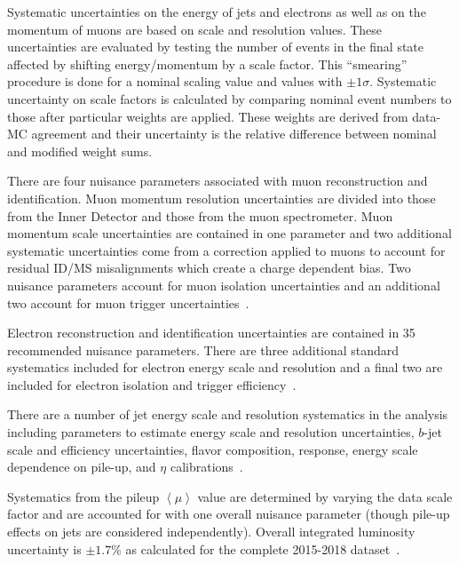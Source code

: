 Systematic uncertainties on the energy of jets and electrons as well as on the momentum of muons are based on scale and resolution values. These uncertainties are evaluated by testing the number of events in the final state affected by shifting energy/momentum by a scale factor. This ``smearing'' procedure is done for a nominal scaling value and values with $\pm 1 \sigma$. Systematic uncertainty on scale factors is calculated by comparing nominal event numbers to those after particular weights are applied. These weights are derived from data-MC agreement and their uncertainty is the relative difference between nominal and modified weight sums.  
 
There are four nuisance parameters associated with muon reconstruction and identification. Muon momentum resolution uncertainties are divided into those from the Inner Detector and those from the muon spectrometer. Muon momentum scale uncertainties are contained in one parameter and two additional systematic uncertainties come from a correction applied to muons to account for residual ID/MS misalignments which create a charge dependent bias. Two nuisance parameters account for muon isolation uncertainties and an additional two account for muon trigger uncertainties~\cite{MCPpaper}.  

Electron reconstruction and identification uncertainties are contained in 35 recommended nuisance parameters. There are three additional standard systematics included for electron energy scale and resolution and a final two are included for electron isolation and trigger efficiency~\cite{ElectronPhotonPerformance}.

There are a number of jet energy scale and resolution systematics in the analysis including parameters to estimate energy scale and resolution uncertainties, $b$-jet scale and efficiency uncertainties, flavor composition, response, energy scale dependence on pile-up, and $\eta$ calibrations~\cite{JETEtmiss}.

Systematics from the pileup $\left<\mu\right>$ value are determined by varying the data scale factor and are accounted for with one overall nuisance parameter (though pile-up effects on jets are considered independently). Overall integrated luminosity uncertainty is $\pm 1.7\%$ as calculated for the complete 2015-2018 dataset~\cite{ATLAS-CONF-2019-021}.

